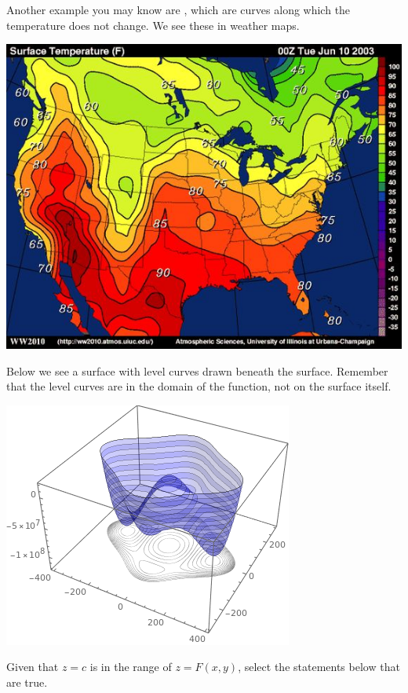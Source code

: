 \documentclass{ximera}
\begin{document}
Another example you may know are , which are curves along which the
temperature does not change. We see these in weather maps.

\begin{image}
  \includegraphics{isotherm.jpg}
\end{image}

 Below we see a surface with level curves drawn
beneath the surface.  Remember that the level curves are in the 
domain of the function, not on the surface itself.

\begin{image}
  \includegraphics{firstContourPlot.png}
\end{image}


\begin{example}
  Given that $z=c$ is in the range of $z=F(x,y)$, select the
  statements below that are true.
  \begin{selectAll}
  \end{selectAll}
\end{example}
\end{document}
